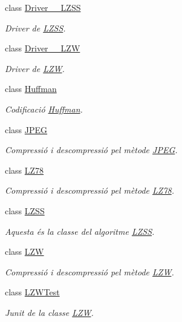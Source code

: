\begin{DoxyCompactItemize}
class \hyperlink{classdomini_1_1algorithm_1_1Driver____LZSS}{Driver\+\_\+\+\_\+\+L\+Z\+SS}
\begin{DoxyCompactList}\small\item\em Driver de \hyperlink{classdomini_1_1algorithm_1_1LZSS}{L\+Z\+SS}. \end{DoxyCompactList}\item 
class \hyperlink{classdomini_1_1algorithm_1_1Driver____LZW}{Driver\+\_\+\+\_\+\+L\+ZW}
\begin{DoxyCompactList}\small\item\em Driver de \hyperlink{classdomini_1_1algorithm_1_1LZW}{L\+ZW}. \end{DoxyCompactList}\item 
class \hyperlink{classdomini_1_1algorithm_1_1Huffman}{Huffman}
\begin{DoxyCompactList}\small\item\em Codificació \hyperlink{classdomini_1_1algorithm_1_1Huffman}{Huffman}. \end{DoxyCompactList}\item 
class \hyperlink{classdomini_1_1algorithm_1_1JPEG}{J\+P\+EG}
\begin{DoxyCompactList}\small\item\em Compressió i descompressió pel mètode \hyperlink{classdomini_1_1algorithm_1_1JPEG}{J\+P\+EG}. \end{DoxyCompactList}\item 
class \hyperlink{classdomini_1_1algorithm_1_1LZ78}{L\+Z78}
\begin{DoxyCompactList}\small\item\em Compressió i descompressió pel mètode \hyperlink{classdomini_1_1algorithm_1_1LZ78}{L\+Z78}. \end{DoxyCompactList}\item 
class \hyperlink{classdomini_1_1algorithm_1_1LZSS}{L\+Z\+SS}
\begin{DoxyCompactList}\small\item\em Aquesta és la classe del algoritme \hyperlink{classdomini_1_1algorithm_1_1LZSS}{L\+Z\+SS}. \end{DoxyCompactList}\item 
class \hyperlink{classdomini_1_1algorithm_1_1LZW}{L\+ZW}
\begin{DoxyCompactList}\small\item\em Compressió i descompressió pel mètode \hyperlink{classdomini_1_1algorithm_1_1LZW}{L\+ZW}. \end{DoxyCompactList}\item 
class \hyperlink{classdomini_1_1algorithm_1_1LZWTest}{L\+Z\+W\+Test}
\begin{DoxyCompactList}\small\item\em Junit de la classe \hyperlink{classdomini_1_1algorithm_1_1LZW}{L\+ZW}. \end{DoxyCompactList}\end{DoxyCompactItemize}
